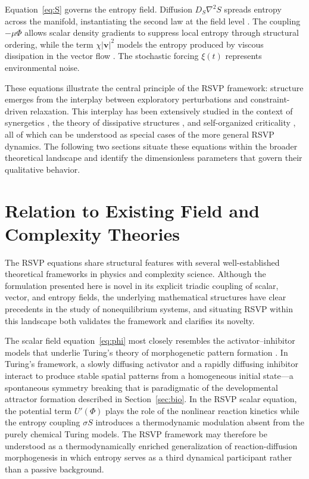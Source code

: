 \documentclass[12pt]{article}
\begin{document}
Equation~\eqref{eq:S} governs the entropy field. Diffusion $D_S \nabla^2 S$ spreads entropy across the manifold, instantiating the second law at the field level \cite{cover2006,jaynes1957}. The coupling $-\mu \Phi$ allows scalar density gradients to suppress local entropy through structural ordering, while the term $\chi|\mathbf{v}|^2$ models the entropy produced by viscous dissipation in the vector flow \cite{prigogine1984}. The stochastic forcing $\xi(t)$ represents environmental noise.

These equations illustrate the central principle of the RSVP framework: structure emerges from the interplay between exploratory perturbations and constraint-driven relaxation. This interplay has been extensively studied in the context of synergetics \cite{haken1983}, the theory of dissipative structures \cite{prigogine1984}, and self-organized criticality \cite{bak1996}, all of which can be understood as special cases of the more general RSVP dynamics. The following two sections situate these equations within the broader theoretical landscape and identify the dimensionless parameters that govern their qualitative behavior.

\section{Relation to Existing Field and Complexity Theories}
\label{sec:relations}

The RSVP equations share structural features with several well-established theoretical frameworks in physics and complexity science. Although the formulation presented here is novel in its explicit triadic coupling of scalar, vector, and entropy fields, the underlying mathematical structures have clear precedents in the study of nonequilibrium systems, and situating RSVP within this landscape both validates the framework and clarifies its novelty.

The scalar field equation~\eqref{eq:phi} most closely resembles the activator--inhibitor models that underlie Turing's theory of morphogenetic pattern formation \cite{nicolis1977}. In Turing's framework, a slowly diffusing activator and a rapidly diffusing inhibitor interact to produce stable spatial patterns from a homogeneous initial state---a spontaneous symmetry breaking that is paradigmatic of the developmental attractor formation described in Section~\ref{sec:bio}. In the RSVP scalar equation, the potential term $U'(\Phi)$ plays the role of the nonlinear reaction kinetics while the entropy coupling $\sigma S$ introduces a thermodynamic modulation absent from the purely chemical Turing models. The RSVP framework may therefore be understood as a thermodynamically enriched generalization of reaction-diffusion morphogenesis in which entropy serves as a third dynamical participant rather than a passive background.
\end{document}
